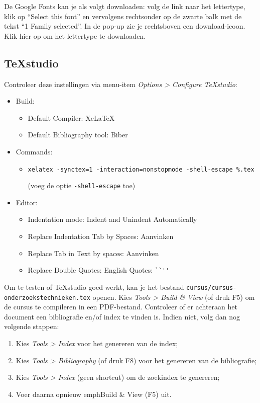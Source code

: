 De Google Fonts kan je als volgt downloaden: volg de link naar het lettertype, klik op ``Select this font'' en vervolgens rechtsonder op de zwarte balk met de tekst ``1 Family selected''. In de pop-up zie je rechtsboven een download-icoon. Klik hier op om het lettertype te downloaden.

\subsection{TeXstudio}

Controleer deze instellingen via menu-item \emph{Options > Configure TeXstudio}:

\begin{itemize}
  \item Build:
  \begin{itemize}
    \item Default Compiler: XeLaTeX
    \item Default Bibliography tool: Biber
  \end{itemize}
  \item Commands:
  \begin{itemize}
    \item \texttt{xelatex -synctex=1 -interaction=nonstopmode  -shell-escape \%.tex}
    
    (voeg de optie \texttt{-shell-escape} toe)
  \end{itemize}
  \item Editor:
  \begin{itemize}
    \item Indentation mode: Indent and Unindent Automatically
    \item Replace Indentation Tab by Spaces: Aanvinken
    \item Replace Tab in Text by spaces: Aanvinken
    \item Replace Double Quotes: English Quotes: \verb|``''|
  \end{itemize}

\end{itemize}

Om te testen of TeXstudio goed werkt, kan je het bestand \texttt{cursus/cursus-onderzoekstech\-nie\-ken.tex} openen. Kies \emph{Tools > Build \& View} (of druk F5) om de cursus te compileren in een PDF-bestand. Controleer of er achteraan het document een bibliografie en/of index te vinden is. Indien niet, volg dan nog volgende stappen:

\begin{enumerate}
  \item Kies \emph{Tools > Index} voor het genereren van de index;
  \item Kies \emph{Tools > Bibliography} (of druk F8) voor het genereren van de bibliografie;
  \item Kies \emph{Tools > Index} (geen shortcut) om de zoekindex te genereren;
  \item Voer daarna opnieuw emph{Build \& View} (F5) uit.
\end{enumerate}

